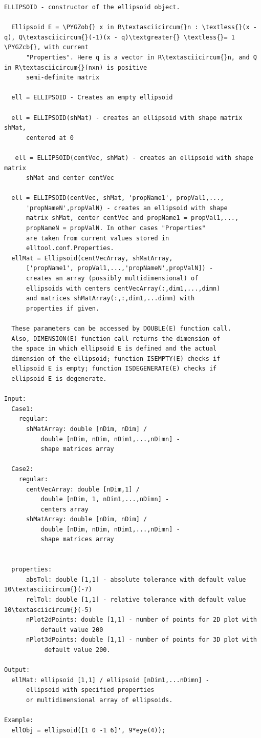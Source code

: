 \documentclass[letterpaper,10pt,english]{sphinxmanual}
\def\PYGZob{\char`\{}
\def\PYGZcb{\char`\}}
\begin{document}
\begin{Verbatim}[commandchars=\\\{\}]
ELLIPSOID - constructor of the ellipsoid object.

  Ellipsoid E = \PYGZob{} x in R\textasciicircum{}n : \textless{}(x - q), Q\textasciicircum{}(-1)(x - q)\textgreater{} \textless{}= 1 \PYGZcb{}, with current
      "Properties". Here q is a vector in R\textasciicircum{}n, and Q in R\textasciicircum{}(nxn) is positive
      semi-definite matrix

  ell = ELLIPSOID - Creates an empty ellipsoid

  ell = ELLIPSOID(shMat) - creates an ellipsoid with shape matrix shMat,
      centered at 0

   ell = ELLIPSOID(centVec, shMat) - creates an ellipsoid with shape matrix
      shMat and center centVec

  ell = ELLIPSOID(centVec, shMat, 'propName1', propVal1,...,
      'propNameN',propValN) - creates an ellipsoid with shape
      matrix shMat, center centVec and propName1 = propVal1,...,
      propNameN = propValN. In other cases "Properties"
      are taken from current values stored in
      elltool.conf.Properties.
  ellMat = Ellipsoid(centVecArray, shMatArray,
      ['propName1', propVal1,...,'propNameN',propValN]) -
      creates an array (possibly multidimensional) of
      ellipsoids with centers centVecArray(:,dim1,...,dimn)
      and matrices shMatArray(:,:,dim1,...dimn) with
      properties if given.

  These parameters can be accessed by DOUBLE(E) function call.
  Also, DIMENSION(E) function call returns the dimension of
  the space in which ellipsoid E is defined and the actual
  dimension of the ellipsoid; function ISEMPTY(E) checks if
  ellipsoid E is empty; function ISDEGENERATE(E) checks if
  ellipsoid E is degenerate.

Input:
  Case1:
    regular:
      shMatArray: double [nDim, nDim] /
          double [nDim, nDim, nDim1,...,nDimn] -
          shape matrices array

  Case2:
    regular:
      centVecArray: double [nDim,1] /
          double [nDim, 1, nDim1,...,nDimn] -
          centers array
      shMatArray: double [nDim, nDim] /
          double [nDim, nDim, nDim1,...,nDimn] -
          shape matrices array


  properties:
      absTol: double [1,1] - absolute tolerance with default value 10\textasciicircum{}(-7)
      relTol: double [1,1] - relative tolerance with default value 10\textasciicircum{}(-5)
      nPlot2dPoints: double [1,1] - number of points for 2D plot with
          default value 200
      nPlot3dPoints: double [1,1] - number of points for 3D plot with
           default value 200.

Output:
  ellMat: ellipsoid [1,1] / ellipsoid [nDim1,...nDimn] -
      ellipsoid with specified properties
      or multidimensional array of ellipsoids.

Example:
  ellObj = ellipsoid([1 0 -1 6]', 9*eye(4));
\end{Verbatim}
\end{document}
